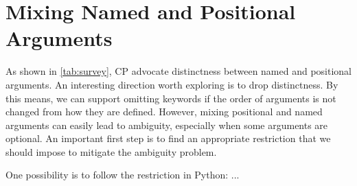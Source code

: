 \section{Mixing Named and Positional Arguments}

As shown in \autoref{tab:survey}, CP advocate distinctness between named and
positional arguments. An interesting direction worth exploring is to drop
distinctness. By this means, we can support omitting keywords if the order of
arguments is not changed from how they are defined. However, mixing positional
and named arguments can easily lead to ambiguity, especially when some arguments
are optional. An important first step is to find an appropriate restriction that
we should impose to mitigate the ambiguity problem.

One possibility is to follow the restriction in Python: ...
